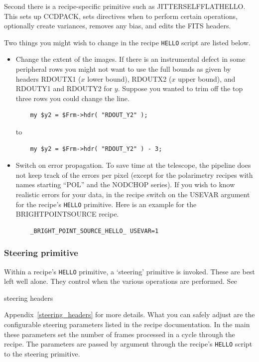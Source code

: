 \documentclass[twoside,11pt]{article}
\newcommand{\htmlref}[2]{#1}
\newenvironment{latexonly}{}{}
\newcommand{\xlabel}[1]{}
\renewcommand{\_}{\texttt{\symbol{95}}}
\newcommand{\CCDPACK}{{\footnotesize CCDPACK}}
\begin{document}
Second there is a recipe-specific primitive such as
\_JITTER\_SELF\_FLAT\_HELLO\_.  This sets up \CCDPACK,
\htmlref{sets directives}{steering_primitive} when to perform certain
operations, optionally \htmlref{create variances}{data_variance},
removes any bias, and \htmlref{edits the FITS headers}{fits_headers}.

Two things you might wish to change in the recipe {\tt\_HELLO} script are
listed below.

\begin{itemize}

\item Change the extent of the images.  If there is an instrumental defect
in some peripheral rows you might not want to use the full bounds
as given by headers RDOUT\_X1 ($x$ lower bound), RDOUT\_X2
($x$ upper bound), and RDOUT\_Y1 and RDOUT\_Y2 for $y$.  Suppose you
wanted to trim off the top three rows you could change the line.

\begin{verbatim}
    my $y2 = $Frm->hdr( "RDOUT_Y2" );
\end{verbatim}
to
\begin{verbatim}
    my $y2 = $Frm->hdr( "RDOUT_Y2" ) - 3;
\end{verbatim}

\item 
\xlabel{switch_on_data_variance}\label{switch_on_data_variance}
Switch on error propagation.  To save time at the telescope, the
pipeline does not keep track of the errors per pixel (except for the
polarimetry recipes with names starting ``POL'' and the NOD\_CHOP
series).  If you wish to know realistic errors for your data, in the
recipe switch on the USEVAR argument for the recipe's {\tt\_HELLO}
primitive.  Here is an example for the
\htmlref{BRIGHT\_POINT\_SOURCE}{BRIGHT\_POINT\_SOURCE} recipe.

\begin{verbatim}
    _BRIGHT_POINT_SOURCE_HELLO_ USEVAR=1
\end{verbatim}

\end{itemize}

\subsubsection{\xlabel{steering_primitive}Steering
primitive\label{steering_primitive}}

Within a recipe's {\tt\_HELLO} primitive, a `steering' primitive is invoked.
These are best left well alone.  They control when the various
operations are performed.  See
\begin{htmlonly}
\htmlref{steering headers}{steering_headers}
\end{htmlonly}
\begin{latexonly}
Appendix~\ref{steering_headers}
\end{latexonly}
for more details.  What you can safely adjust are the
configurable steering parameters listed in the recipe documentation.
In the main these parameters set the number of frames processed in a
cycle through the recipe.  The parameters are passed by argument
through the recipe's {\tt\_HELLO} script to the steering primitive.
\end{document}
